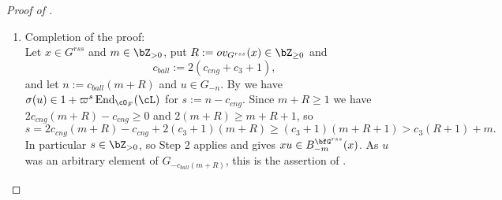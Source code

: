 \documentclass[12pt,a4paper]{amsart}%
\begin{document}
{\begin{proof}[Proof of ]
\begin{enumerate}[Step 1.]
The rectification being simple,
$B^{\bfG^{rss}}_{-m}(g)=i^{-1}\bigl(i(g)+\varpi^{m}\cO_F^{M}\bigr)$ by
\eqref{def:simp balls:2}, so it is enough to show that
$|i_j(gu)-i_j(g)|\leq\ell^{-m}$ for $1\leq j\leq M$.
From $|\fD(g)^{N}-\fD(gu)^{N}|\leq|\fD(g)|^{N-1}|\fD(g)-\fD(gu)|$, $|\fD(g)|^{N}\leq\ell^{Nc_2(R+1)}$ and
$|\fD(g)|^{-1}\leq\ell^{R}$ we get
\begin{align*}
\bigl|\fD(gu)^{-N}-\fD(g)^{-N}\bigr|=\frac{\bigl|\fD(g)^{N}-\fD(gu)^{N}\bigr|}{|\fD(g)\fD(gu)|^{N}}
&\leq\ell^{Nc_2(R+1)+R}\cdot\ell^{2NR}\cdot\ell^{c_2(R+1)-s}\\
&=\ell^{(N+1)c_2(R+1)+(2N+1)R-s} .
\end{align*}
Since $i_j=P_j\fD^{-N}$ we have
$$
i_j(gu)-i_j(g)=\bigl(P_j(gu)-P_j(g)\bigr)\fD(gu)^{-N}+P_j(g)\bigl(\fD(gu)^{-N}-\fD(g)^{-N}\bigr) ,
$$
and $|\fD(gu)^{-N}|\leq\ell^{NR}$, so by the first two bounds above both summands are at most
$\ell^{(N+2)c_2(R+1)+(2N+1)R-s}\leq\ell^{c_3(R+1)-s}$. As $s>c_3(R+1)+m$, this is smaller than
$\ell^{-m}$, as required.
\item Completion of the proof:\\
Let $x\in G^{rss}$ and $m\in\Z_{>0}$, put $R:=ov_{G^{rss}}(x)\in\Z_{\geq0}$ and
$$
c_{ball}:=2(c_{cng}+c_3+1) ,
$$
and let $n:=c_{ball}(m+R)$ and $u\in G_{-n}$. By  we have
$\sigma(u)\in1+\varpi^{s}\End_{\cO_F}(\cL)$ for $s:=n-c_{cng}$. Since $m+R\geq1$ we have
$2c_{cng}(m+R)-c_{cng}\geq0$ and $2(m+R)\geq m+R+1$, so
$$
s=2c_{cng}(m+R)-c_{cng}+2(c_3+1)(m+R)\geq(c_3+1)(m+R+1)>c_3(R+1)+m .
$$
In particular $s\in\Z_{>0}$, so Step 2 applies and gives $xu\in B^{\bfG^{rss}}_{-m}(x)$. As $u$ was
an arbitrary element of $G_{-c_{ball}(m+R)}$, this is the assertion of .
\end{enumerate}
\end{proof}
}
\end{document}

